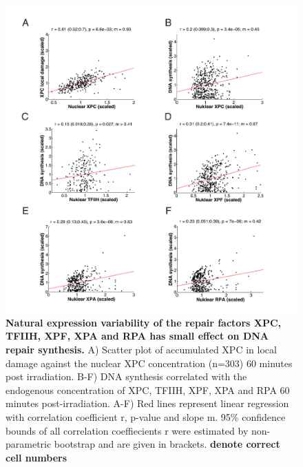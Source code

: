 \begin{figure}[htbp]
	\begin{center}
		\includegraphics[width=1\textwidth]{Abbildungen/figure3_3.pdf}
		\caption{\textbf{Natural expression variability of the repair factors XPC, TFIIH, XPF, XPA and RPA has small effect on DNA repair synthesis.} A) Scatter plot of accumulated XPC in local damage against the nuclear XPC concentration (n=303) 60 minutes post irradiation. B-F) DNA synthesis correlated with the endogenous concentration of XPC, TFIIH, XPF, XPA and RPA 60 minutes post-irradiation. A-F) Red lines represent linear regression with correlation coefficient r, p-value and slope m. 95\% confidence bounds of all correlation coeffiecients r were estimated by non-parametric bootstrap and are given in brackets. \textbf{denote correct cell numbers} }
		\label{fig:Nuc_vs_DNAsynthesis}
	\end{center}
\end{figure}

